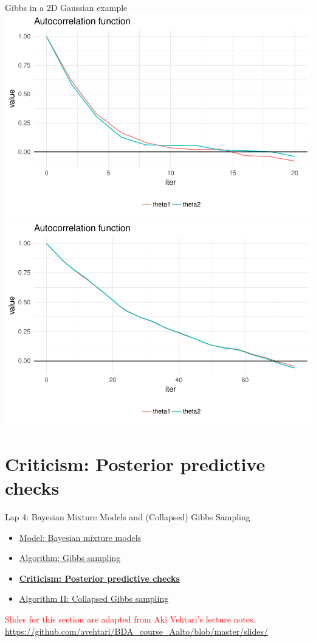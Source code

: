 \documentclass[aspectratio=169]{beamer}
\begin{document}
\begin{frame}{Gibbs in a 2D Gaussian example}
\centering
\includegraphics[width=.45\textwidth]{figures/lap4/Gibbs1acf.pdf}
\includegraphics[width=.45\textwidth]{figures/lap4/Gibbs2acf.pdf}
\end{frame}


\section{Criticism: Posterior predictive checks}
\label{sec:ppcs}


\begin{frame}{Lap 4: Bayesian Mixture Models and (Collapsed) Gibbs Sampling}
\begin{itemize}
    \item \hyperref[sec:mixtures]{Model: Bayesian mixture models}
    \item \hyperref[sec:gibbs]{Algorithm: Gibbs sampling}
    \item \hyperref[sec:ppcs]{\textbf{Criticism: Posterior predictive checks}}
    \item \hyperref[sec:collapsed_gibbs]{Algorithm II: Collapsed Gibbs sampling}
\end{itemize}

\vspace{3em}

\begin{center}
    {\Large \textcolor{red}{Slides for this section are adapted from Aki Vehtari's lecture notes.}}
    {\footnotesize \url{https://github.com/avehtari/BDA_course_Aalto/blob/master/slides/}}
\end{center}
\end{frame}
\end{document}
